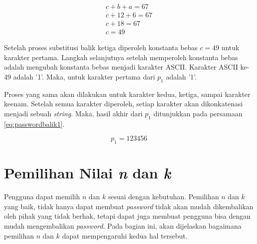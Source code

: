 \begin{align}
	c + b + a = 67 \nonumber \\
	c + 12 + 6 = 67 \nonumber \\
	c + 18 = 67 \nonumber \\
	c = 49 \label{eq:gauss8}
\end{align}

Setelah proses substitusi balik ketiga diperoleh konstanta bebas \begin{math}c=49\end{math} untuk karakter pertama. Langkah selanjutnya setelah memperoleh konstanta bebas adalah mengubah konstanta bebas menjadi karakter ASCII. Karakter ASCII ke-49 adalah '1'. Maka, untuk karakter pertama dari \begin{math}p_1\end{math} adalah '1'.

Proses yang sama akan dilakukan untuk karakter kedua, ketiga, sampai karakter keenam. Setelah semua karakter diperoleh, setiap karakter akan dikonkatenasi menjadi sebuah \textit{string}. Maka, hasil akhir dari \begin{math}p_1\end{math} ditunjukkan pada persamaan \ref{eq:passwordbalik1}.

\begin{equation}
	p_1 = 123456 \label{eq:passwordbalik1}
\end{equation}

\section{Pemilihan Nilai \textit{n} dan \textit{k}}\label{subsec:pilihnk}

Pengguna dapat memilih \begin{math}n\end{math} dan \begin{math}k\end{math} sesuai dengan kebutuhan. Pemilihan \begin{math}n\end{math} dan \begin{math}k\end{math} yang baik, tidak hanya dapat membuat \textit{password} tidak akan mudah dikembalikan oleh pihak yang tidak berhak, tetapi dapat juga membuat pengguna bisa dengan mudah mengembalikan \textit{password}\cite{ellison2000protecting}. Pada bagian ini, akan dijelaskan bagaimana pemilihan \begin{math}n\end{math} dan \begin{math}k\end{math} dapat mempengaruhi kedua hal tersebut.


